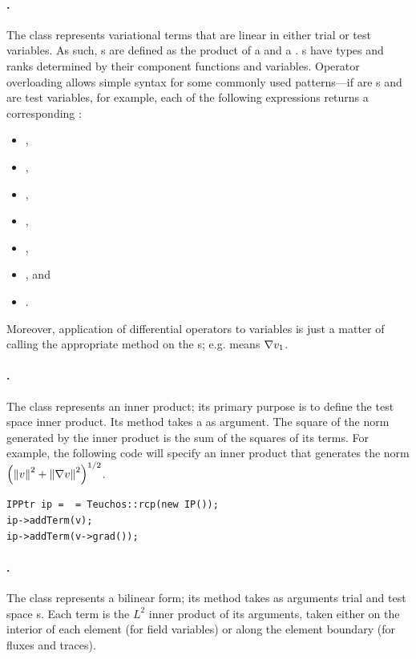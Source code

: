 \paragraph{.}  The  class represents variational terms that are linear in either trial or test variables.  As such, s are defined as the product of a  and a .  s have types and ranks determined by their component functions and variables.  Operator overloading allows simple syntax for some commonly used patterns---if  are s and  are test variables, for example, each of the following expressions returns a corresponding :
\begin{itemize}
\item {},
\item {},
\item {},
\item {},
\item {},
\item {}, and
\item {}.
\end{itemize}
Moreover, application of differential operators to variables is just a matter of calling the appropriate method on the s; e.g.  means $\NVRgrad v_{1}$.

\paragraph{.}  The  class represents an inner product; its primary purpose is to define the test space inner product.  Its  method takes a  as argument.  The square of the norm generated by the inner product is the sum of the squares of its terms.  For example, the following code will specify an inner product that generates the norm $\left(\norm{v}^{2} + \norm{\NVRgrad v}^{2}\right)^{1/2}$.

\begin{lstlisting}
IPPtr ip =  = Teuchos::rcp(new IP());
ip->addTerm(v);
ip->addTerm(v->grad());
\end{lstlisting}

\paragraph{.} The  class represents a bilinear form; its  method takes as arguments trial and test space s.  Each term is the $L^{2}$ inner product of its arguments, taken either on the interior of each element (for field variables) or along the element boundary (for fluxes and traces).

